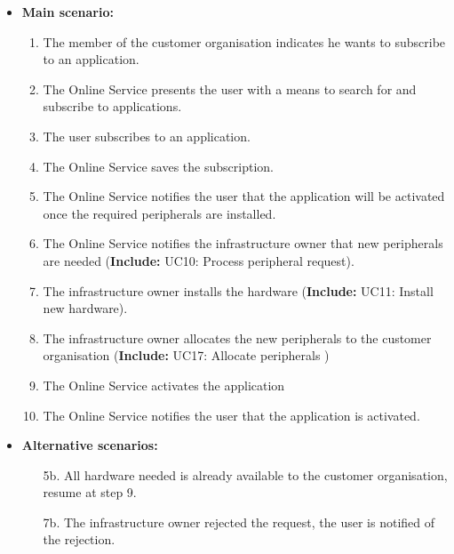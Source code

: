 \documentclass[english]{sareport}
\begin{document}
\begin{itemize}
        
    \item \textbf{Main scenario:} 
    \begin{enumerate}
       \item The member of the customer organisation indicates he wants to subscribe to an application.
       \item The Online Service presents the user with a means to search for and subscribe to applications.
       \item The user subscribes to an application.
	\item The Online Service saves the subscription.
	\item The Online Service notifies the user that the application will be activated once the required peripherals are installed.
	\item The Online Service notifies the infrastructure owner that new peripherals are needed (\textbf{Include:} UC10: Process peripheral request).
	\item The infrastructure owner installs the hardware (\textbf{Include:} UC11: Install new hardware).
    \item The infrastructure owner allocates the new peripherals to the customer organisation (\textbf{Include:} UC17: Allocate peripherals )
	\item The Online Service activates the application
	\item The Online Service notifies the user that the application is activated.
    \end{enumerate}

    \item \textbf{Alternative scenarios:} 
      \begin{enumerate}
 	\item [5b.] All hardware needed is already available to the customer organisation, resume at step 9.
        \item [7b.] The infrastructure owner rejected the request, the user is notified of the rejection.
      \end{enumerate}
\end{itemize}
\end{document}
